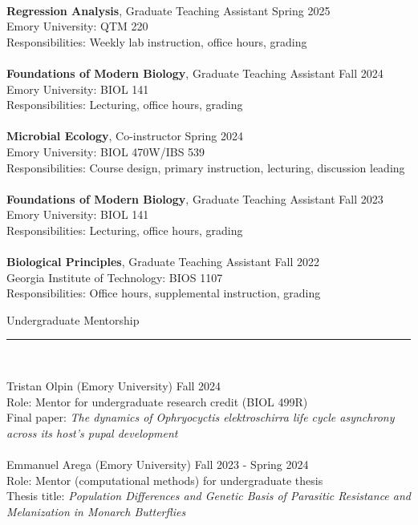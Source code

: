 \documentclass{article}
\begin{document}
\\
\textbf{Regression Analysis}, Graduate Teaching Assistant \hfill Spring 2025 \\
Emory University: QTM 220 \\
Responsibilities: Weekly lab instruction, office hours, grading 
\\
\\
\textbf{Foundations of Modern Biology}, Graduate Teaching Assistant \hfill Fall 2024 \\
Emory University: BIOL 141\\
Responsibilities: Lecturing, office hours, grading 
\\
\\
\textbf{Microbial Ecology}, Co-instructor \hfill Spring 2024 \\
Emory University: BIOL 470W/IBS 539\\
Responsibilities: Course design, primary instruction, lecturing, discussion leading
\\
\\
\textbf{Foundations of Modern Biology}, Graduate Teaching Assistant \hfill Fall 2023 \\
Emory University: BIOL 141\\
Responsibilities: Lecturing, office hours, grading 
\\
\\
\textbf{Biological Principles}, Graduate Teaching Assistant \hfill Fall 2022\\
Georgia Institute of Technology: BIOS 1107 \\
Responsibilities: Office hours, supplemental instruction, grading
\\
\begin{flushleft}
{\Large Undergraduate Mentorship} \rule{16.51cm}{0.4pt}\\
\end{flushleft}
Tristan Olpin (Emory University) \hfill Fall 2024 \\
Role: Mentor for undergraduate research credit (BIOL 499R) \\
Final paper: \emph{The dynamics of Ophryocyctis elektroschirra life cycle asynchrony across its host’s pupal development}\\
\\    
Emmanuel Arega (Emory University) \hfill Fall 2023 - Spring 2024 \\
Role: Mentor (computational methods) for undergraduate thesis \\
Thesis title: \emph{Population Differences and Genetic Basis of Parasitic Resistance and Melanization in Monarch Butterflies}\\
\end{document}
